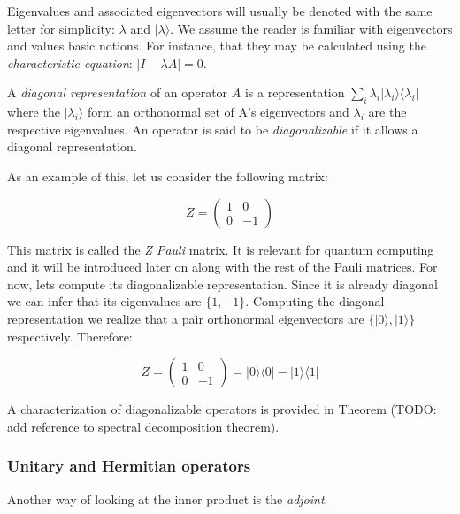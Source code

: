 \documentclass{article}
\begin{document}
	Eigenvalues and associated eigenvectors will usually be denoted with the same letter for simplicity: $\lambda$ and $|\lambda\rangle$. We assume the reader is familiar with eigenvectors and values basic notions. For instance, that they may be calculated using the \emph{characteristic equation}: $|I - \lambda A| = 0$.
	
	\begin{definition}
		A \emph{diagonal representation} of an operator $A$ is a representation $\sum_i \lambda_i |\lambda_i\rangle\langle\lambda_i|$ where the $|\lambda_i\rangle$ form an orthonormal set of A's eigenvectors and $\lambda_i$ are the respective eigenvalues. An operator is said to be \emph{diagonalizable} if it allows a diagonal representation.
	\end{definition}
	
	\begin{exampleth}
		As an example of this, let us consider the following matrix:
		
		$$ Z = 
		\begin{pmatrix}
			1 & 0 \\
			0 & -1 
		\end{pmatrix}
		$$
		
		This matrix is called the \emph{Z Pauli} matrix. It is relevant for quantum computing and it will be introduced later on along with the rest of the Pauli matrices. For now, lets compute its diagonalizable representation. Since it is already diagonal we can infer that its eigenvalues are $\{1, -1\}$. Computing the diagonal representation we realize that a pair orthonormal eigenvectors are $\{|0\rangle, |1\rangle\}$ respectively. Therefore:
		
		$$ Z = 
		\begin{pmatrix}
			1 & 0 \\
			0 & -1 
		\end{pmatrix} = 
		|0\rangle\langle0| - |1\rangle\langle1|
		$$
	\end{exampleth}
	
	A characterization of diagonalizable operators is provided in Theorem (TODO: add reference to spectral decomposition theorem).
	
	
	\subsubsection{Unitary and Hermitian operators}
	
	
	Another way of looking at the inner product is the \emph{adjoint}.
	
\end{document}
